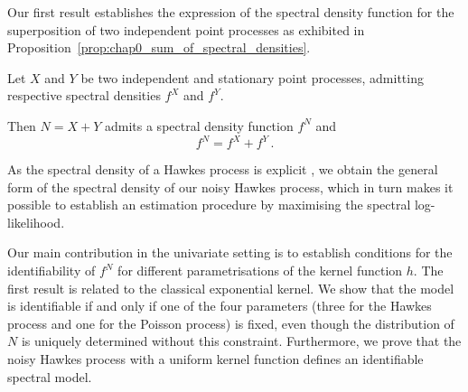     Our first result establishes the expression of the spectral density function for the superposition of two independent point processes as exhibited in Proposition~\ref{prop:chap0_sum_of_spectral_densities}.

    \begin{proposition}\label{prop:chap0_sum_of_spectral_densities}
      Let $X$ and $Y$ be two independent and stationary point processes, admitting respective spectral densities ${f}^X$ and ${f}^Y$.
      
      Then $N = X + Y$ admits a spectral density function $f^N$ and
      \begin{equation} \label{eq:chap0_sum_spectral_densities}
        {f}^N = {f}^X + {f}^Y\,.
      \end{equation}
    \end{proposition}
    As the spectral density of a Hawkes process is explicit \parencite[Example 8.2(e)]{DaleyV1}, we obtain the general form of the spectral density of our noisy Hawkes process, which in turn makes it possible to establish an estimation procedure by maximising the spectral log-likelihood.

    
    Our main contribution in the univariate setting is to establish conditions for the identifiability of $f^N$ for different parametrisations of the kernel function $h$. 
    The first result is related to the classical exponential kernel. 
    We show that the model is identifiable if and only if one of the four parameters (three for the Hawkes process and one for the Poisson process) is fixed, even though the distribution of $N$ is uniquely determined without this constraint.
    Furthermore, we prove that the noisy Hawkes process with a uniform kernel function defines an identifiable spectral model.


